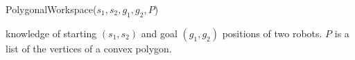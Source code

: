 \begin{algorithm}[htb]
\caption{ { \sc PolygonalWorkspace}($s_1,s_2,g_1,g_2, P$)}\label{alg:polygonReachbale}
\begin{algorithmic}[1]
\Require knowledge of starting $(s_1,s_2)$ and goal $(g_1,g_2)$ positions of  two robots. 
$P$ is a list of the vertices of a convex polygon. 

\end{algorithmic}
\end{algorithm}



